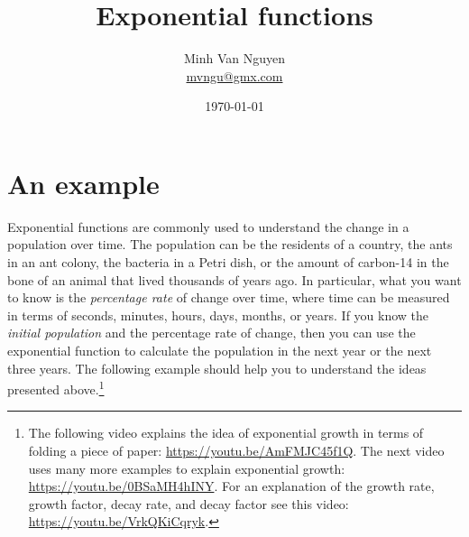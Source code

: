 \documentclass[a4paper,oneside,12pt]{article}
\begin{document}
\title{\Large\bf Exponential functions}
\author{%
  Minh Van Nguyen \\
  \url{mvngu@gmx.com}
}
\date{\today}
\maketitle



\section{An example}

Exponential functions are commonly used to understand the change in a
population over time.  The population can be the residents of a
country, the ants in an ant colony, the bacteria in a Petri dish, or
the amount of carbon-14 in the bone of an animal that lived thousands
of years ago.  In particular, what you want to know is the
\emph{percentage rate} of change over time, where time can be measured
in terms of seconds, minutes, hours, days, months, or years.  If you
know the \emph{initial population} and the percentage rate of change,
then you can use the exponential function to calculate the population
in the next year or the next three years.  The following example
should help you to understand the ideas presented above.\footnote{
  The following video explains the idea of exponential growth in terms
  of folding a piece of paper:
  \url{https://youtu.be/AmFMJC45f1Q}.
  The next video uses many more examples to explain exponential
  growth:
  \url{https://youtu.be/0BSaMH4hINY}.
  For an explanation of the growth rate, growth factor, decay rate,
  and decay factor see this video:
  \url{https://youtu.be/VrkQKiCqryk}.
}
\end{document}
